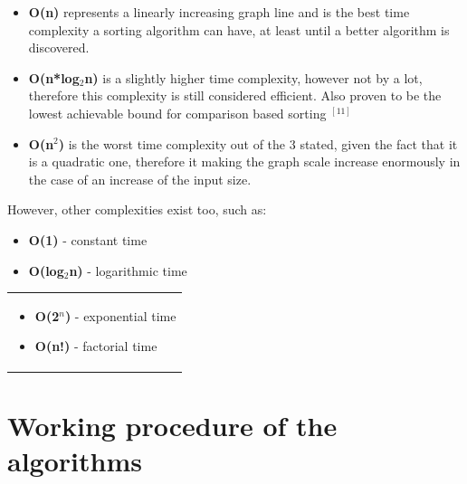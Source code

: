 \documentclass{article}
\begin{document}
\begin{itemize}
\item \textbf{O(n)} represents a linearly increasing graph line and is the best time complexity a sorting algorithm can have, at least until a better algorithm is discovered. 


\item \textbf{O(n*log$_2$n)} is a slightly higher time complexity, however not by a lot, therefore this complexity is still considered efficient. Also proven to be the lowest achievable bound for comparison based sorting $^{[11]}$


\item \textbf{O(n$^2$)} is the worst time complexity out of the 3 stated, given the fact that it is a quadratic one, therefore it making the graph scale increase enormously in the case of an increase of the input size.
\end{itemize}

However, other complexities exist too, such as:
\newline
\begin{minipage}{0.45\textwidth}
\begin{itemize}
  \item \textbf{O(1)} - constant time
  \item \textbf{O(log$_2$n)} - logarithmic time
\end{itemize}
\end{minipage}%
\hfill
\begin{minipage}{0.45\textwidth}
\begin{tabular}{p{\textwidth}}
\begin{itemize}
    \item \textbf{O(2$^{n}$)} - exponential time
    \item \textbf{O(n!)} - factorial time
\end{itemize}
\end{tabular}
\end{minipage}%


\clearpage


   \section{Working procedure of the algorithms} 
\end{document}
